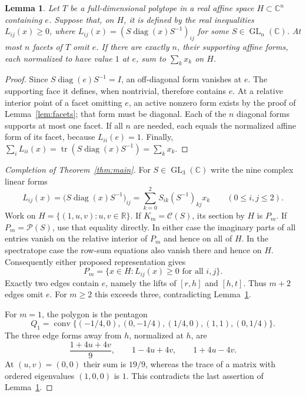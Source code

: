 \documentclass[11pt,a4paper]{article}
\newtheorem{lemma}[theorem]{Lemma}
\newcommand{\R}{\mathbb R}
\newcommand{\C}{\mathbb C}
\newcommand{\conv}{\operatorname{conv}}
\newcommand{\diag}{\operatorname{diag}}
\begin{document}
\begin{lemma}\label{lem:identity}
Let $T$ be a full-dimensional polytope in a real affine space $H\subset\C^n$
containing $e$. Suppose that, on $H$, it is defined by the real inequalities
$L_{ij}(x)\geq0$, where $L_{ij}(x)=(S\diag(x)S^{-1})_{ij}$ for
some $S\in\operatorname{GL}_n(\C)$.
At most $n$ facets of $T$ omit $e$. If there are exactly $n$, their
supporting affine forms, each normalized to have value $1$ at $e$,
sum to $\sum_kx_k$ on $H$.
\end{lemma}
\begin{proof}
Since $S\diag(e)S^{-1}=I$, an off-diagonal form vanishes at $e$.
The supporting face it defines, when nontrivial, therefore contains $e$.
At a relative interior point of a facet omitting $e$, an active nonzero
form exists by the proof of Lemma~\ref{lem:facets}; that form must be
diagonal. Each of the $n$ diagonal forms supports at most one facet.
If all $n$ are needed, each equals the normalized affine form of its
facet, because $L_{ii}(e)=1$. Finally,
$\sum_iL_{ii}(x)=\operatorname{tr}(S\diag(x)S^{-1})=\sum_kx_k$.
\end{proof}

\begin{proof}[Completion of Theorem~\ref{thm:main}]
For $S\in\operatorname{GL}_3(\C)$ write the nine complex linear forms
\[
 L_{ij}(x)=\bigl(S\diag(x)S^{-1}\bigr)_{ij}
          =\sum_{k=0}^2 S_{ik}(S^{-1})_{kj}x_k
 \qquad (0\leq i,j\leq2).
\]
Work on $H=\{(1,u,v):u,v\in\R\}$. If $K_m=\mathcal C(S)$,
its section by $H$ is $P_m$. If $P_m=\mathcal P(S)$, use that
equality directly. In either case the imaginary parts of all entries
vanish on the relative interior of $P_m$ and hence on all of $H$.
In the spectratope case the row-sum equations also vanish there and hence
on $H$. Consequently either proposed representation gives
\[
 P_m=\{x\in H:L_{ij}(x)\geq0
                              \text{ for all }i,j\}.
\]
Exactly two edges contain $e$, namely the lifts of $[r,h]$ and $[h,t]$.
Thus $m+2$ edges omit $e$. For $m\geq2$ this exceeds three,
contradicting Lemma~\ref{lem:identity}.

For $m=1$, the polygon is the pentagon
\[
 Q_1=\conv\{(-1/4,0),(0,-1/4),(1/4,0),(1,1),(0,1/4)\}.
\]
The three edge forms away from $h$, normalized at $h$, are
\[
 \frac{1+4u+4v}{9},\qquad 1-4u+4v,\qquad 1+4u-4v.
\]
At $(u,v)=(0,0)$ their sum is $19/9$, whereas the trace of a
matrix with ordered eigenvalues $(1,0,0)$ is $1$.
This contradicts the last assertion of Lemma~\ref{lem:identity}.
\end{proof}
\end{document}
